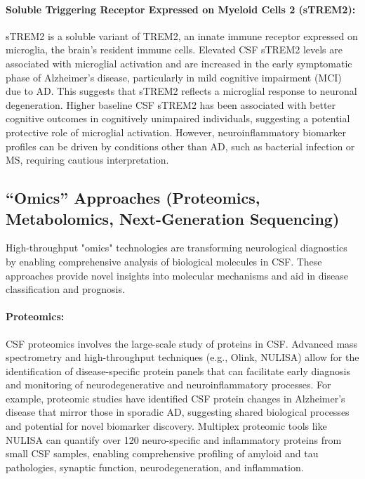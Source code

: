 	\paragraph{Soluble Triggering Receptor Expressed on Myeloid Cells 2 (sTREM2):} sTREM2 is a soluble variant of TREM2, an innate immune receptor expressed on microglia, the brain's resident immune cells. Elevated CSF sTREM2 levels are associated with microglial activation and are increased in the early symptomatic phase of Alzheimer's disease, particularly in mild cognitive impairment (MCI) due to AD. This suggests that sTREM2 reflects a microglial response to neuronal degeneration. Higher baseline CSF sTREM2 has been associated with better cognitive outcomes in cognitively unimpaired individuals, suggesting a potential protective role of microglial activation. However, neuroinflammatory biomarker profiles can be driven by conditions other than AD, such as bacterial infection or MS, requiring cautious interpretation.
	
	\subsection*{``Omics'' Approaches (Proteomics, Metabolomics, Next-Generation Sequencing)}
	
	High-throughput "omics" technologies are transforming neurological diagnostics by enabling comprehensive analysis of biological molecules in CSF. These approaches provide novel insights into molecular mechanisms and aid in disease classification and prognosis.
	
	\paragraph{Proteomics:} CSF proteomics involves the large-scale study of proteins in CSF. Advanced mass spectrometry and high-throughput techniques (e.g., Olink, NULISA) allow for the identification of disease-specific protein panels that can facilitate early diagnosis and monitoring of neurodegenerative and neuroinflammatory processes. For example, proteomic studies have identified CSF protein changes in Alzheimer's disease that mirror those in sporadic AD, suggesting shared biological processes and potential for novel biomarker discovery. Multiplex proteomic tools like NULISA can quantify over 120 neuro-specific and inflammatory proteins from small CSF samples, enabling comprehensive profiling of amyloid and tau pathologies, synaptic function, neurodegeneration, and inflammation.
	
